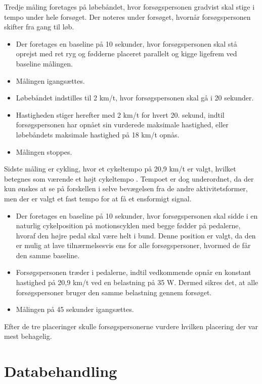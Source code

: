 Tredje måling foretages på løbebåndet, hvor forsøgspersonen gradvist skal stige i tempo under hele forsøget. Der noteres under forsøget, hvornår forsøgspersonen skifter fra gang til løb.  %
\begin{itemize}
	\item Der foretages en baseline på 10 sekunder, hvor forsøgspersonen skal stå oprejst med ret ryg og fødderne placeret parallelt og kigge ligefrem ved baseline målingen.
	\item Målingen igangsættes.
	\item Løbebåndet indstilles til 2 km/t, hvor forsøgspersonen skal gå i 20 sekunder.  
	\item Hastigheden stiger herefter med 2 km/t for hvert 20. sekund, indtil forsøgspersonen har opnået sin vurderede maksimale hastighed, eller løbebåndets maksimale hastighed på 18 km/t opnås. 
	\item Målingen stoppes. 
\end{itemize}

Sidste måling er cykling, hvor et cykeltempo på 20,9 km/t er valgt, hvilket betegnes som værende et højt cykeltempo \citep{Miles2007}. Tempoet er dog underordnet, da der kun ønskes at se på forskellen i selve bevægelsen fra de andre aktivitetsformer, men der er valgt et fast tempo for at få et ensformigt signal. %
\begin{itemize}
	\item Der foretages en baseline på 10 sekunder, hvor forsøgspersonen skal sidde i en naturlig cykelposition på motionscyklen med begge fødder på pedalerne, hvoraf den højre pedal skal være helt i bund. Denne position er valgt, da den er mulig at lave tilnærmelsesvis ens for alle forsøgspersoner, hvormed de får den samme baseline.
	\item Forsøgspersonen træder i pedalerne, indtil vedkommende opnår en konstant hastighed på 20,9 km/t ved en belastning på 35 W. Dermed sikres det, at alle forsøgspersoner bruger den samme belastning gennem forsøget.  
	\item Målingen på 45 sekunder igangsættes. 
\end{itemize}
Efter de tre placeringer skulle forsøgspersonerne vurdere hvilken placering der var mest behagelig.

\section{Databehandling}
